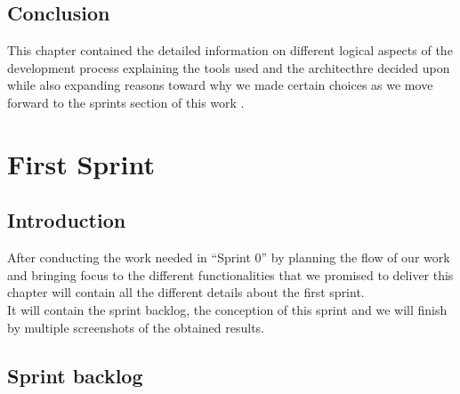 \documentclass[]{report}
\begin{document}
\section{Conclusion}

This chapter contained the detailed information on different logical aspects of the development process explaining the tools used and the architecthre decided upon while also expanding reasons toward why we made certain choices as we move forward to the sprints section of this work .

\chapter{First Sprint}
\section{Introduction}
After conducting the work needed in “Sprint 0” by planning the flow of our work and bringing focus to the different functionalities that we promised to deliver this chapter will contain all the different details about the first sprint. \\
It will contain the sprint backlog, the conception of this sprint and we will finish by multiple screenshots of the obtained results.

\section{Sprint backlog}
\end{document}
